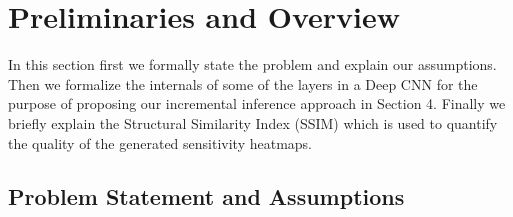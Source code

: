 \section{Preliminaries and Overview}\label{sec:preliminaries}
In this section first we formally state the problem and explain our assumptions.
Then we formalize the internals of some of the layers in a Deep CNN for the purpose of proposing our incremental inference approach in Section 4.
Finally we briefly explain the Structural Similarity Index (SSIM) which is used to quantify the quality of the generated sensitivity heatmaps.

\subsection{Problem Statement and Assumptions}

